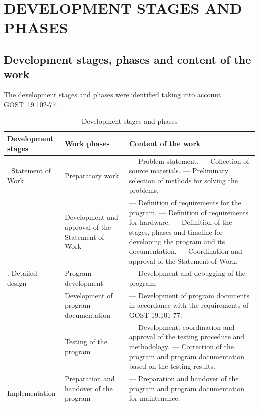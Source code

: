 \documentclass[12pt,a4paper]{extarticle}
\begin{document}
\section{DEVELOPMENT STAGES AND PHASES}

\subsection{Development stages, phases and content of the work}

The development stages and phases were identified taking into account GOST~19.102-77\cite{gost19102}.

\begin{table}[H]
\caption{Development stages and phases}
\label{tab:stages}
\small
\begin{tabularx}{\textwidth}{|>{\raggedright\arraybackslash}p{3.5cm}|>{\raggedright\arraybackslash}p{3.5cm}|>{\raggedright\arraybackslash}X|}
\hline
\textbf{Development stages} & \textbf{Work phases} & \textbf{Content of the work} \\
\hline
1. Statement of Work & Preparatory work & --- Problem statement.\newline
--- Collection of source materials.\newline
--- Preliminary selection of methods for solving the problems. \\
\hline
& Development and approval of the Statement of Work & --- Definition of requirements for the program.\newline
--- Definition of requirements for hardware.\newline
--- Definition of the stages, phases and timeline for developing the program and its documentation.\newline
--- Coordination and approval of the Statement of Work. \\
\hline
2. Detailed design & Program development & --- Development and debugging of the program. \\
\hline
& Development of program documentation & --- Development of program documents in accordance with the requirements of GOST 19.101-77\cite{gost19101}. \\
\hline
& Testing of the program & --- Development, coordination and approval of the testing procedure and methodology.\newline
--- Correction of the program and program documentation based on the testing results. \\
\hline
3. Implementation & Preparation and handover of the program & --- Preparation and handover of the program and program documentation for maintenance. \\
\hline
\end{tabularx}
\end{table}
\end{document}

